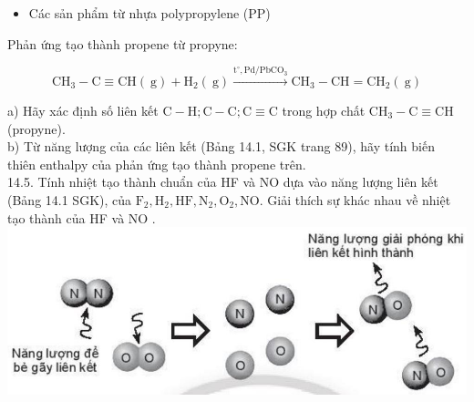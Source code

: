 \documentclass[10pt]{article}
\begin{document}
\begin{itemize}
  \item Các sản phẩm từ nhựa polypropylene (PP)
\end{itemize}

Phản ứng tạo thành propene từ propyne:

$$
\mathrm{CH}_{3}-\mathrm{C} \equiv \mathrm{CH}(\mathrm{~g})+\mathrm{H}_{2}(\mathrm{~g}) \xrightarrow{\mathrm{t}^{\circ}, \mathrm{Pd} / \mathrm{PbCO}_{3}} \mathrm{CH}_{3}-\mathrm{CH}=\mathrm{CH}_{2}(\mathrm{~g})
$$

a) Hãy xác định số liên kết $\mathrm{C}-\mathrm{H} ; \mathrm{C}-\mathrm{C} ; \mathrm{C} \equiv \mathrm{C}$ trong hợp chất $\mathrm{CH}_{3}-\mathrm{C} \equiv \mathrm{CH}$ (propyne).\\
b) Từ năng lượng của các liên kết (Bảng 14.1, SGK trang 89), hãy tính biến thiên enthalpy của phản ứng tạo thành propene trên.\\
14.5. Tính nhiệt tạo thành chuẩn của HF và NO dựa vào năng lượng liên kết (Bảng 14.1 SGK), của $\mathrm{F}_{2}, \mathrm{H}_{2}, \mathrm{HF}, \mathrm{N}_{2}, \mathrm{O}_{2}, \mathrm{NO}$. Giải thích sự khác nhau về nhiệt tạo thành của HF và NO .\\
\includegraphics[max width=\textwidth, center]{2025_10_23_883c4b146e2332109fcdg-52(1)}
\end{document}
